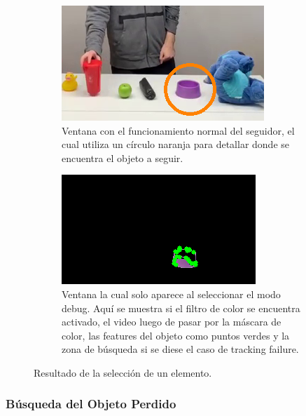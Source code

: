 \begin{figure}[H]
\centering
	\begin{subfigure}{.4\textwidth}
		\centering
		\includegraphics[width=\textwidth]{Imagenes/Optical1.png}
		\caption{Ventana con el funcionamiento normal del seguidor, el cual utiliza un círculo naranja para detallar donde se encuentra el objeto a seguir.}
		\label{fig:optical1}
	\end{subfigure}
	\begin{subfigure}{.4\textwidth}
		\centering
		\includegraphics[width=\textwidth]{Imagenes/Optical2.png}
		\caption{Ventana la cual solo aparece al seleccionar el modo debug. Aquí se muestra si el filtro de color se encuentra activado, el video luego de pasar por la máscara de color, las features del objeto como puntos verdes y la zona de búsqueda si se diese el caso de tracking failure.}
		\label{fig:optical2}
	\end{subfigure}
	\caption{Resultado de la selección de un elemento.}
	\label{fig:optical12}
\end{figure}

\subsubsection{Búsqueda del Objeto Perdido}

